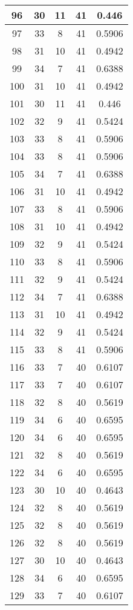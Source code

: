 \documentclass[letterpaper, 12pt]{article}
\begin{document}
\begin{longtable}{|c|c|c|c|c|}
\hline
96 & 30 & 11 & 41 & 0.446 \\
\hline
97 & 33 & 8 & 41 & 0.5906 \\
\hline
98 & 31 & 10 & 41 & 0.4942 \\
\hline
99 & 34 & 7 & 41 & 0.6388 \\
\hline
100 & 31 & 10 & 41 & 0.4942 \\
\hline
101 & 30 & 11 & 41 & 0.446 \\
\hline
102 & 32 & 9 & 41 & 0.5424 \\
\hline
103 & 33 & 8 & 41 & 0.5906 \\
\hline
104 & 33 & 8 & 41 & 0.5906 \\
\hline
105 & 34 & 7 & 41 & 0.6388 \\
\hline
106 & 31 & 10 & 41 & 0.4942 \\
\hline
107 & 33 & 8 & 41 & 0.5906 \\
\hline
108 & 31 & 10 & 41 & 0.4942 \\
\hline
109 & 32 & 9 & 41 & 0.5424 \\
\hline
110 & 33 & 8 & 41 & 0.5906 \\
\hline
111 & 32 & 9 & 41 & 0.5424 \\
\hline
112 & 34 & 7 & 41 & 0.6388 \\
\hline
113 & 31 & 10 & 41 & 0.4942 \\
\hline
114 & 32 & 9 & 41 & 0.5424 \\
\hline
115 & 33 & 8 & 41 & 0.5906 \\
\hline
116 & 33 & 7 & 40 & 0.6107 \\
\hline
117 & 33 & 7 & 40 & 0.6107 \\
\hline
118 & 32 & 8 & 40 & 0.5619 \\
\hline
119 & 34 & 6 & 40 & 0.6595 \\
\hline
120 & 34 & 6 & 40 & 0.6595 \\
\hline
121 & 32 & 8 & 40 & 0.5619 \\
\hline
122 & 34 & 6 & 40 & 0.6595 \\
\hline
123 & 30 & 10 & 40 & 0.4643 \\
\hline
124 & 32 & 8 & 40 & 0.5619 \\
\hline
125 & 32 & 8 & 40 & 0.5619 \\
\hline
126 & 32 & 8 & 40 & 0.5619 \\
\hline
127 & 30 & 10 & 40 & 0.4643 \\
\hline
128 & 34 & 6 & 40 & 0.6595 \\
\hline
129 & 33 & 7 & 40 & 0.6107 \\

\end{longtable}
\end{document}
